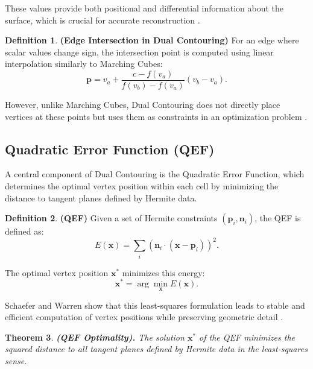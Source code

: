 \documentclass[12pt, a4paper, oneside]{book}
\theoremstyle{plain}
\newtheorem{theorem}{Theorem}[chapter]
\theoremstyle{definition}
\newtheorem{definition}[theorem]{Definition}
\theoremstyle{remark}
\theoremstyle{definition}
\begin{document}
These values provide both positional and differential information about the surface, which is crucial for accurate reconstruction \cite{ju2002dual,kobbelt2001feature}.

\vspace{0.5em}
\begin{definition}
    \textbf{(Edge Intersection in Dual Contouring)}
For an edge where scalar values change sign, the intersection point is computed using linear interpolation similarly to Marching Cubes:
\[
\mathbf{p} = v_a + \frac{c - f(v_a)}{f(v_b) - f(v_a)} (v_b - v_a).
\]
\end{definition}


However, unlike Marching Cubes, Dual Contouring does not directly place vertices at these points but uses them as constraints in an optimization problem \cite{ju2002dual}.

\vspace{0.5em}

\subsection{Quadratic Error Function (QEF)}

A central component of Dual Contouring is the Quadratic Error Function, which determines the optimal vertex position within each cell by minimizing the distance to tangent planes defined by Hermite data.

\begin{definition}
\textbf{(QEF)}    
Given a set of Hermite constraints $(\mathbf{p}_i, \mathbf{n}_i)$, the QEF is defined as:
\[
E(\mathbf{x}) = \sum_i \left( \mathbf{n}_i \cdot (\mathbf{x} - \mathbf{p}_i) \right)^2.
\]
\end{definition}

The optimal vertex position $\mathbf{x}^*$ minimizes this energy:
\[
\mathbf{x}^* = \arg\min_{\mathbf{x}} E(\mathbf{x}).
\]

Schaefer and Warren show that this least-squares formulation leads to stable and efficient computation of vertex positions while preserving geometric detail \cite{schaefer2005qef,ju2002dual}.

\vspace{0.5em}

\begin{theorem}
    \textbf{ (QEF Optimality).}
The solution $\mathbf{x}^*$ of the QEF minimizes the squared distance to all tangent planes defined by Hermite data in the least-squares sense.
\end{theorem}
\end{document}
